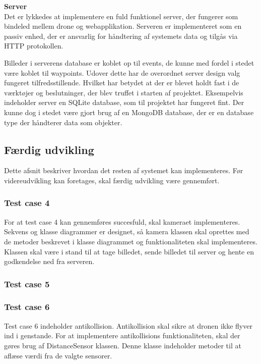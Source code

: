 \newpage

\textbf{Server}\\
Det er lykkedes at implementere en fuld funktionel server, der fungerer som bindeled mellem drone og webapplikation. Serveren er implementeret som en passiv enhed, der er ansvarlig for håndtering af systemets data og tilgås via HTTP protokollen. 

Billeder i serverens database er koblet op til events, de kunne med fordel i stedet være koblet til waypoints. Udover dette har de overordnet server design valg fungeret tilfredsstillende. Hvilket har betydet at der er blevet holdt fast i de værktøjer og beslutninger, der blev truffet i starten af projektet. Eksempelvis indeholder server en SQLite database, som til projektet har fungeret fint. Der kunne dog i stedet være gjort brug af en MongoDB database, der er en database type der håndterer data som objekter.


\newpage

\subsection{Færdig udvikling}
Dette afsnit beskriver hvordan det resten af systemet kan implementeres. Før videreudvikling kan foretages, skal færdig udvikling være gennemført.

\subsubsection*{Test case 4}
For at test case 4 kan gennemføres succesfuld, skal kameraet implementeres. 
Sekvens og klasse diagrammer er designet, så kamera klassen skal oprettes med de metoder beskrevet i klasse diagrammet og funktionaliteten skal implementeres. Klassen skal være i stand til at tage billedet, sende billedet til server og hente en godkendelse ned fra serveren.

\subsubsection*{Test case 5}

\subsubsection*{Test case 6}
Test case 6 indeholder antikollision. Antikollision skal sikre at dronen ikke flyver ind i genstande. For at implementere antikollisions funktionaliteten, skal der gøres brug af DistanceSensor klassen. Denne klasse indeholder metoder til at aflæse værdi fra de valgte sensorer. 


